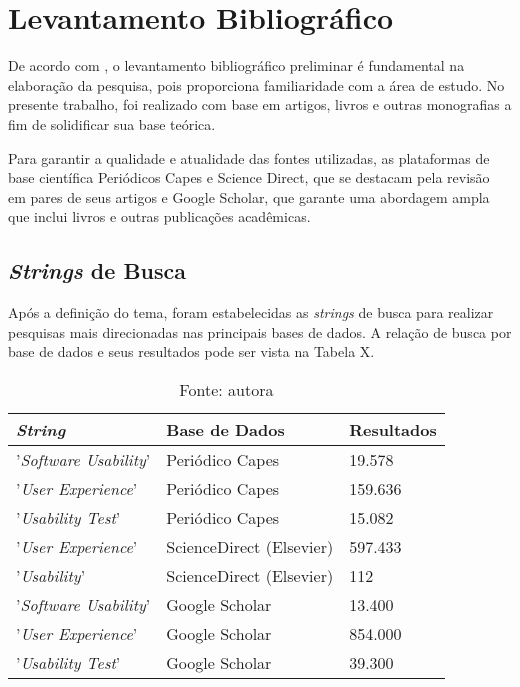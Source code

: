\section{Levantamento Bibliográfico}
\label{sec:Levantamento Bibliografico}
De acordo com , o levantamento bibliográfico preliminar é fundamental na elaboração da pesquisa, pois proporciona familiaridade com a área de estudo. No presente trabalho, foi realizado com base em artigos, livros e outras monografias a fim de solidificar sua base teórica.

Para garantir a qualidade e atualidade das fontes utilizadas, as plataformas de base científica Periódicos Capes e Science Direct, que se destacam pela revisão em pares de seus artigos e Google Scholar, que garante uma abordagem ampla que inclui livros e outras publicações acadêmicas. 

\subsection{\textit{Strings} de Busca}
\label{sec:Strings de Busca}
Após a definição do tema, foram estabelecidas as \textit{strings} de busca para realizar pesquisas mais direcionadas nas principais bases de dados. A relação de busca por base de dados e seus resultados pode ser vista na Tabela X.

\begin{table}[h]
	\centering
	\caption{Fonte: autora}
	\begin{tabular}{|l|l|l|}
	\hline
	\textit{String}               & Base de Dados            & Resultados \\ \hline
	'\textit{Software Usability}' & Periódico Capes          & 19.578     \\ \hline
	'\textit{User Experience}'    & Periódico Capes          & 159.636    \\ \hline
	'\textit{Usability Test}'     & Periódico Capes          & 15.082     \\ \hline
	'\textit{User Experience}'    & ScienceDirect (Elsevier) & 597.433    \\ \hline
	'\textit{Usability}'          & ScienceDirect (Elsevier) & 112        \\ \hline
	'\textit{Software Usability}' & Google Scholar           & 13.400     \\ \hline
	'\textit{User Experience}'    & Google Scholar           & 854.000    \\ \hline
	'\textit{Usability Test}'     & Google Scholar           & 39.300     \\ \hline
	\end{tabular}
\end{table}

